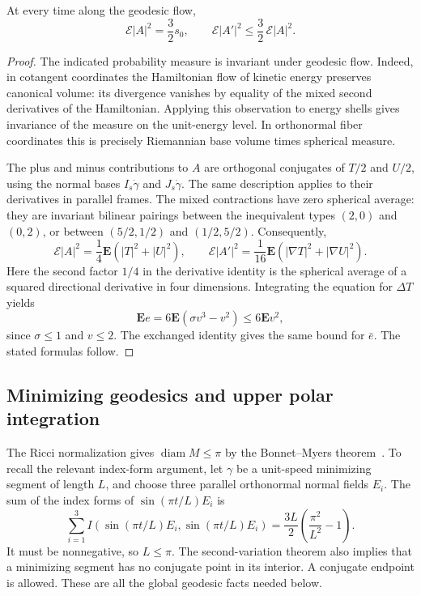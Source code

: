 \begin{lemma}\label{lem:geodesic-averages}
At every time along the geodesic flow,
\[
 \mathcal E|A|^2=\frac32s_0,\qquad
 \mathcal E|A'|^2\le\frac32\,\mathcal E|A|^2.
 \tag{8}\label{eq:8}
\]
\end{lemma}
\begin{proof}
The indicated probability measure is invariant under geodesic flow.
Indeed, in cotangent coordinates the Hamiltonian flow of kinetic energy
preserves canonical volume: its divergence vanishes by equality of the
mixed second derivatives of the Hamiltonian.  Applying this observation
to energy shells gives invariance of the measure on the unit-energy
level.  In orthonormal fiber coordinates this is precisely Riemannian
base volume times spherical measure.

The plus and minus contributions to $A$ are orthogonal conjugates of
$T/2$ and $U/2$, using the normal bases $I_s\dot\gamma$ and
$J_s\dot\gamma$.  The same description applies to their derivatives in
parallel frames.  The mixed contractions have zero spherical average:
they are invariant bilinear pairings between the inequivalent types
$(2,0)$ and $(0,2)$, or between $(5/2,1/2)$ and $(1/2,5/2)$.
Consequently,
\[
 \mathcal E|A|^2=\frac14\mathbf E(|T|^2+|U|^2),\qquad
 \mathcal E|A'|^2
 =\frac1{16}\mathbf E(|\nabla T|^2+|\nabla U|^2).
\]
Here the second factor $1/4$ in the derivative identity is the spherical
average of a squared directional derivative in four dimensions.
Integrating the equation for $\Delta T$ yields
\[
 \mathbf E e=6\mathbf E(\sigma v^3-v^2)\le6\mathbf E v^2,
\]
since $\sigma\le1$ and $v\le2$.  The exchanged identity gives the same
bound for $\bar e$.  The stated formulas follow.
\end{proof}

\subsection{Minimizing geodesics and upper polar integration}

The Ricci normalization gives $\operatorname{diam}M\le\pi$ by the
Bonnet--Myers theorem~\cite{Myers1941}. To recall the relevant
index-form argument, let $\gamma$ be a unit-speed minimizing segment
of length $L$, and choose three parallel orthonormal normal fields
$E_i$. The sum of the index forms of
$\sin(\pi t/L)E_i$ is
\[
 \sum_{i=1}^3 I(\sin(\pi t/L)E_i,\sin(\pi t/L)E_i)
 =\frac{3L}{2}\left(\frac{\pi^2}{L^2}-1\right).
\]
It must be nonnegative, so $L\le\pi$. The second-variation theorem
also implies that a minimizing segment has no conjugate point in its
interior. A conjugate endpoint is allowed. These are all the global
geodesic facts needed below.

